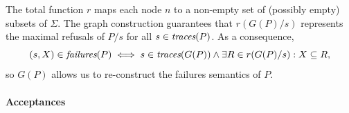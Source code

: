 \documentclass[3p,times]{elsarticle}
\newcommand{\trc}{\text{\it traces}}
\newcommand{\fails}{\text{\it failures}}
\newcommand{\ii}[1]{\underline{#1}}
\newcommand{\refs}{\text{\it Ref}}
\newcommand{\maxrefs}{\text{\it maxRef}}
\begin{document}
The total function $r$ maps each node $n$ to a non-empty set of  (possibly
empty) subsets of $\Sigma$. The graph construction guarantees that
$r(G(P)/s)$ represents the maximal refusals of $P/s$ for all $s\in\trc(P)$.
As a consequence,
\begin{equation}\label{eq:refsAndR}
(s,X)\in\fails(P) \iff s\in\trc(G(P)) \wedge \exists R\in r(G(P)/s): X\subseteq R,
\end{equation}
so $G(P)$ allows us to re-construct the failures semantics of $P$.


\paragraph{Acceptances} \label{sec:accs}
\end{document}
